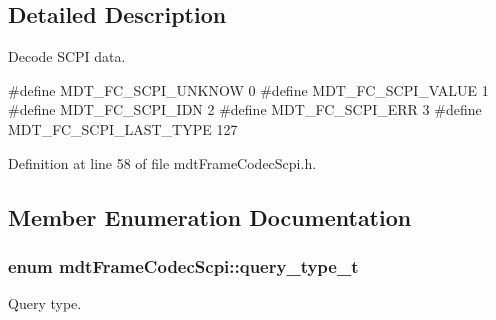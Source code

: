 \subsection{Detailed Description}
Decode SCPI data. 

\#define MDT\_\-FC\_\-SCPI\_\-UNKNOW 0 \#define MDT\_\-FC\_\-SCPI\_\-VALUE 1 \#define MDT\_\-FC\_\-SCPI\_\-IDN 2 \#define MDT\_\-FC\_\-SCPI\_\-ERR 3 \#define MDT\_\-FC\_\-SCPI\_\-LAST\_\-TYPE 127 

Definition at line 58 of file mdtFrameCodecScpi.h.



\subsection{Member Enumeration Documentation}
\hypertarget{classmdt_frame_codec_scpi_a2dbce7589140e915f3e253c3523b3b9a}{
\subsubsection[{query\_\-type\_\-t}]{\setlength{\rightskip}{0pt plus 5cm}enum {\bf mdtFrameCodecScpi::query\_\-type\_\-t}}}
\label{classmdt_frame_codec_scpi_a2dbce7589140e915f3e253c3523b3b9a}


Query type. 

